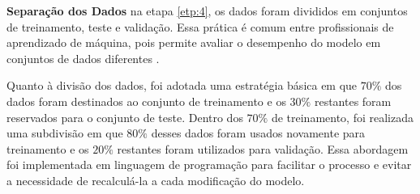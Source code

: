 \textbf{Separa\c c\~ao dos Dados}
na etapa \ref{etp:4}, os dados foram divididos em conjuntos de treinamento, teste e validação. Essa prática é comum entre profissionais de aprendizado de máquina, pois permite avaliar o desempenho do modelo em conjuntos de dados diferentes \cite{raschka2015practical, geron2017hands_on}.

Quanto à divisão dos dados, foi adotada uma estratégia básica em que $70\%$ dos dados foram destinados ao conjunto de treinamento e os $30\%$ restantes foram reservados para o conjunto de teste. Dentro dos $70\%$ de treinamento, foi realizada uma subdivisão em que $80\%$ desses dados foram usados novamente para treinamento e os $20\% $ restantes foram utilizados para validação. Essa abordagem foi implementada em linguagem de programação para facilitar o processo e evitar a necessidade de recalculá-la a cada modificação do modelo.
